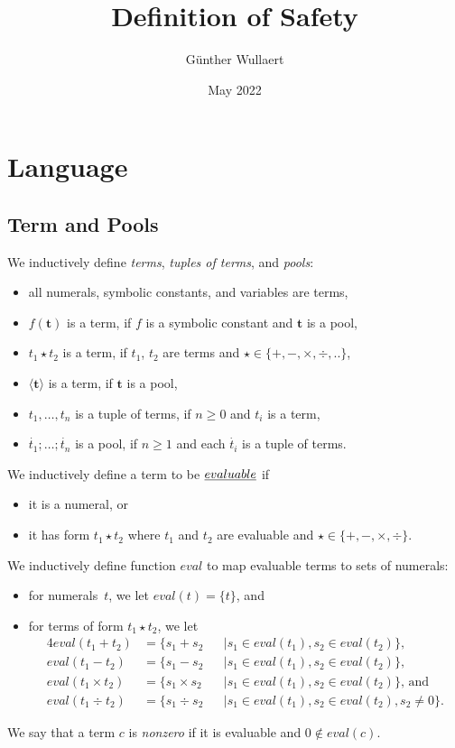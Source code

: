 \documentclass{article}
\title{Definition of Safety}
\author{Günther Wullaert}
\date{May 2022}
\newcommand{\pool}[1]{\boldsymbol{#1}}
\newcommand{\tuple}[1]{\dot{#1}}
\newcommand{\set}[1]{\{#1\}}
\newcommand\Eval{\mathit{eval}}
\begin{document}
	\maketitle

	\section{Language}
	\subsection{Term and Pools}

	We inductively define \emph{terms}, \emph{tuples of terms}, and \emph{pools}:
	\begin{itemize}
		\item all numerals, symbolic constants, and variables are terms,
		\item $f(\pool{t})$ is a term, if $f$ is a symbolic constant and $\pool{t}$ is a pool,
		\item $t_1 \star t_2$ is a term, if $t_1$, $t_2$ are terms and ${\star} \in \set{{+}, {-}, {\times}, {\div}, {..}}$,
		\item $\langle \pool{t} \rangle$ is a term, if $\pool{t}$ is a pool,
		\item $t_1,\dots,t_n$ is a tuple of terms, if $n \ge 0$ and $t_i$ is a term,
		\item $\tuple{t_1};\dots;\tuple{t_n}$ is a pool, if $n \ge 1$ and each $\tuple{t_i}$ is a tuple of terms.
	\end{itemize}

	We inductively define a term to be $\emph{evaluable}$ if
	\begin{itemize}
		\item it is a numeral, or
		\item it has form $t_1 \star t_2$ where $t_1$ and $t_2$ are evaluable and $\star \in \set{{+}, {-}, {\times}, {\div}}$.
	\end{itemize}

	We inductively define function $\Eval$ to map evaluable terms to sets of numerals:
	\begin{itemize}
	\item for numerals~\(t\), we let $\Eval(t) = \{t\}$, and
	\item for terms of form $t_1 \star t_2$, we let
	\begin{alignat*}{4}
		\Eval(t_1 + t_2) &= \{ s_1 + s_2 &&\mid s_1 \in \Eval(t_1), s_2 \in \Eval(t_2) \}, \\
		\Eval(t_1 - t_2) &= \{ s_1 - s_2 &&\mid s_1 \in \Eval(t_1), s_2 \in \Eval(t_2) \}, \\
		\Eval(t_1 \times t_2) &= \{ s_1 \times s_2 &&\mid s_1 \in \Eval(t_1), s_2 \in \Eval(t_2) \}\text{, and} \\
		\Eval(t_1 \div t_2) &= \{ s_1 \div s_2 &&\mid s_1 \in \Eval(t_1), s_2 \in \Eval(t_2), s_2 \neq 0 \}.
	\end{alignat*}
	\end{itemize}
	We say that a term $c$ is \emph{nonzero} if it is evaluable and $0 \notin \Eval(c)$.
\end{document}
